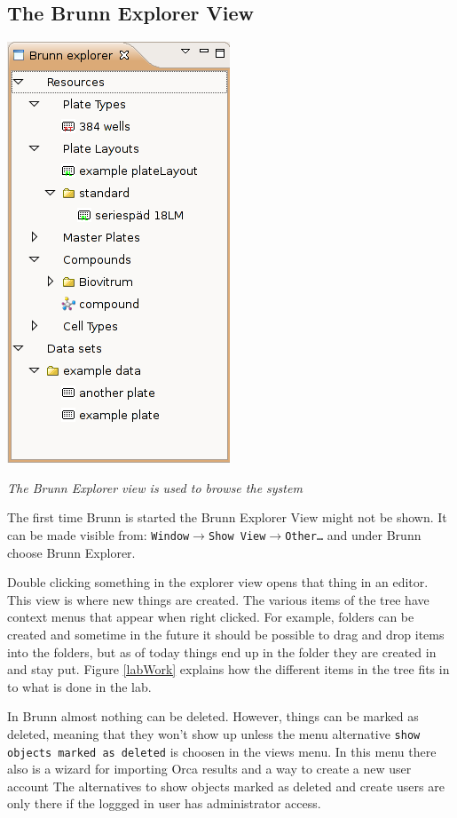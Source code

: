 \documentclass[a4paper,10pt]{article}
\begin{document}
         \subsection{The Brunn Explorer View} 
            \begin{floatingfigure}{0.3\textwidth}
                \begin{center}
                    \includegraphics[width=.2\textwidth]
                                    {images/explorerView.png}
                \end{center}
                \caption{\textit{The Brunn Explorer view is used to browse the
                    system}}
                \label{explorerView}
            \end{floatingfigure}

            \noindent
            The first time Brunn is started the Brunn Explorer View might not
            be shown. It can be made visible from:
            \texttt{Window$\rightarrow$Show View$\rightarrow$Other\ldots} and
            under Brunn choose Brunn Explorer. 

            Double clicking something in the explorer view opens that thing in
            an editor. This view is where new things are created. The various
            items of the tree have context menus that appear when right
            clicked. For example, folders can be created and sometime in the
            future it should be possible to drag and drop items into the
            folders, but as of today things end up in the folder they are
            created in and stay put. Figure \ref{labWork} explains how the
            different items in the tree fits in to what is done in the lab.
            
            In Brunn almost nothing can be deleted. However, things can be
            marked as deleted, meaning that they won't show up unless the menu
            alternative \texttt{show objects marked as deleted} is choosen in
            the views menu. In this menu there also is a wizard for importing
            Orca results and a way to create a new user account The
            alternatives to show objects marked as deleted and create users are
            only there if the loggged in user has administrator access.
        
\end{document}
